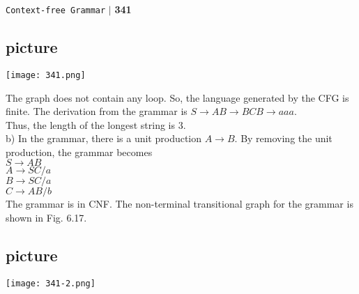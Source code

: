 \documentclass[a4]{article}
\begin{document}
\begin{flushright}
\texttt{Context-free Grammar} \hspace*{0.1cm}\textbf{$|$} \hspace*{0.1cm} \textbf{341}\hspace*{0.1cm}
\end{flushright}
\vspace*{0.3cm}

\begin{center}
  \section{picture}
\texttt{[image: 341.png]}
\end{center}

The graph does not contain any loop. So, the language generated by the CFG is finite. The derivation
from the grammar is $S \rightarrow AB \rightarrow BCB \rightarrow aaa$.\\
\hspace*{0.5cm} Thus, the length of the longest string is 3.\\

\vspace*{0.2cm}
\hspace*{-0.5cm} b) In the grammar, there is a unit production $A \rightarrow B$. By removing the unit production, the grammar
becomes\\

\hspace*{4cm} $S \rightarrow AB$ \\
\hspace*{4cm} $A \rightarrow SC/a$ \\
\hspace*{4cm} $B \rightarrow SC/a$ \\
\hspace*{4cm} $C \rightarrow AB/b$ \\

\vspace*{0.2cm}
The grammar is in CNF. The non-terminal transitional graph for the grammar is shown in Fig. 6.17.\\


\begin{center}
  \section{picture}
\texttt{[image: 341-2.png]}
\end{center}
\end{document}
